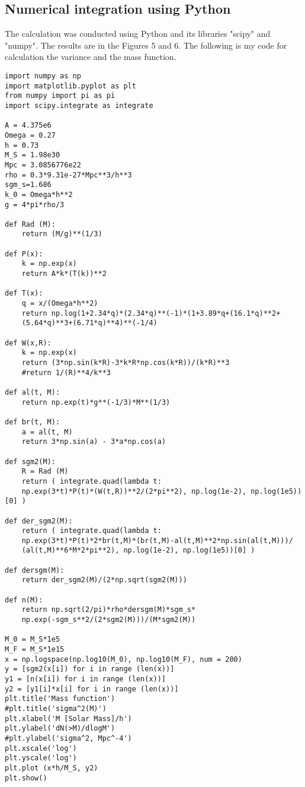 \documentclass[11pt]{article}
\begin{document}
\subsection{Numerical integration using Python}
The calculation was conducted using Python and its libraries "scipy" and "numpy". The results are in the Figures 5 and 6. The following is my code for calculation the variance and the mass function.

\lstset{language=Python}
\begin{lstlisting}
import numpy as np
import matplotlib.pyplot as plt
from numpy import pi as pi
import scipy.integrate as integrate

A = 4.375e6
Omega = 0.27
h = 0.73
M_S = 1.98e30
Mpc = 3.0856776e22
rho = 0.3*9.31e-27*Mpc**3/h**3
sgm_s=1.686
k_0 = Omega*h**2
g = 4*pi*rho/3

def Rad (M):
    return (M/g)**(1/3)     
    
def P(x):
    k = np.exp(x)
    return A*k*(T(k))**2
            
def T(x):
    q = x/(Omega*h**2)
    return np.log(1+2.34*q)*(2.34*q)**(-1)*(1+3.89*q+(16.1*q)**2+
    (5.64*q)**3+(6.71*q)**4)**(-1/4)

def W(x,R):
    k = np.exp(x)
    return (3*np.sin(k*R)-3*k*R*np.cos(k*R))/(k*R)**3
    #return 1/(R)**4/k**3    

def al(t, M):
    return np.exp(t)*g**(-1/3)*M**(1/3)
    
def br(t, M):
    a = al(t, M)
    return 3*np.sin(a) - 3*a*np.cos(a)
    
def sgm2(M):
    R = Rad (M)   
    return ( integrate.quad(lambda t:
    np.exp(3*t)*P(t)*(W(t,R))**2/(2*pi**2), np.log(1e-2), np.log(1e5))[0] )  

def der_sgm2(M):         
    return ( integrate.quad(lambda t:
    np.exp(3*t)*P(t)*2*br(t,M)*(br(t,M)-al(t,M)**2*np.sin(al(t,M)))/
    (al(t,M)**6*M*2*pi**2), np.log(1e-2), np.log(1e5))[0] )

def dersgm(M):
    return der_sgm2(M)/(2*np.sqrt(sgm2(M)))

def n(M):
    return np.sqrt(2/pi)*rho*dersgm(M)*sgm_s*
    np.exp(-sgm_s**2/(2*sgm2(M)))/(M*sgm2(M))
    
M_0 = M_S*1e5
M_F = M_S*1e15
x = np.logspace(np.log10(M_0), np.log10(M_F), num = 200) 
y = [sgm2(x[i]) for i in range (len(x))]
y1 = [n(x[i]) for i in range (len(x))]
y2 = [y1[i]*x[i] for i in range (len(x))]
plt.title('Mass function')
#plt.title('sigma^2(M)')
plt.xlabel('M [Solar Mass]/h')
plt.ylabel('dN(>M)/dlogM')
#plt.ylabel('sigma^2, Mpc^-4')
plt.xscale('log')
plt.yscale('log')
plt.plot (x*h/M_S, y2)
plt.show()
\end{lstlisting}
\end{document}
